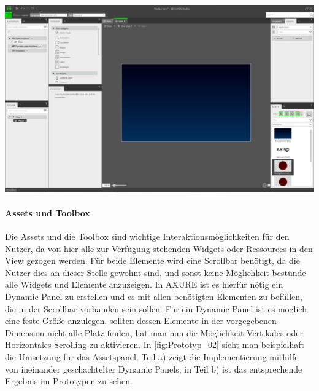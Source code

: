 \begin{center}
  \includegraphics[scale=0.4]{figures/Prototyp_01.PNG}
  \label{fig:Prototyp_01}
\end{center}

\paragraph{Assets und Toolbox}
Die Assets und die Toolbox sind wichtige Interaktionsmöglichkeiten für den Nutzer, da von hier alle zur Verfügung stehenden Widgets oder Ressources in den View gezogen werden.
Für beide Elemente wird eine Scrollbar benötigt, da die Nutzer dies an dieser Stelle gewohnt sind, und sonst keine Möglichkeit bestünde alle Widgets und Elemente anzuzeigen.
In AXURE ist es hierfür nötig ein Dynamic Panel zu erstellen und es mit allen benötigten Elementen zu befüllen, die in der Scrollbar vorhanden sein sollen.
Für ein Dynamic Panel ist es möglich eine feste Größe anzulegen, sollten dessen Elemente in der vorgegebenen Dimension nicht alle Platz finden, hat man nun die Möglichkeit Vertikales oder Horizontales Scrolling zu aktivieren.
In \cref{fig:Prototyp_02} sieht man beispielhaft die Umsetzung für das Assetspanel.
Teil a) zeigt die Implementierung mithilfe von ineinander geschachtelter Dynamic Panels, in Teil b) ist das entsprechende Ergebnis im Prototypen zu sehen.

